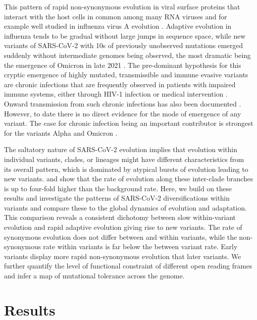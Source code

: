 \documentclass[aps,rmp, twocolumn]{revtex4}
\begin{document}
This pattern of rapid non-synonymous evolution in viral surface proteins that interact with the host cells in common among many RNA viruses and for example well studied in influenza virus A evolution \citep{bhatt_genomic_2011,strelkowa_clonal_2012}.
Adaptive evolution in influenza tends to be gradual without large jumps in sequence space, while new variants of SARS-CoV-2 with 10s of previously unobserved mutations emerged suddenly without intermediate genomes being observed, the most dramatic being the emergence of Omicron in late 2021 \citep{viana_rapid_2022}.
The pre-dominant hypothesis for this cryptic emergence of highly mutated, transmissible and immune evasive variants are chronic infections that are frequently observed in patients with impaired immune systems, either through HIV-1 infection \citep{cele_sars-cov-2_2022} or medical intervention \citep{choi_persistence_2020,kemp_sars-cov-2_2021}.
Onward transmission from such chronic infections has also been documented \citep{gonzalez-reiche_intrahost_2022}.
However, to date there is no direct evidence for the mode of emergence of any variant.
The case for chronic infection being an important contributor is strongest for the variants Alpha and Omicron \citep{hill_origins_2022}.

The saltatory nature of SARS-CoV-2 evolution implies that evolution within individual variants, clades, or lineages might have different characteristics from its overall pattern, which is dominated by atypical bursts of evolution leading to new variants.
\citet{tay_emergence_2022} and \citet{hill_origins_2022} show that the rate of evolution along these inter-clade branches is up to four-fold higher than the background rate.
Here, we build on these results and investigate the patterns of SARS-CoV-2 diversifications within variants and compare these to the global dynamics of evolution and adaptation.
This comparison reveals a consistent dichotomy between slow within-variant evolution and rapid adaptive evolution giving rise to new variants.
The rate of synonymous evolution does not differ between and within variants, while the non-synonymous rate within variants is far below the between variant rate.
Early variants display more rapid non-synonymous evolution that later variants.
We further quantify the level of functional constraint of different open reading frames and infer a map of mutational tolerance across the genome.

\section*{Results}
\end{document}
